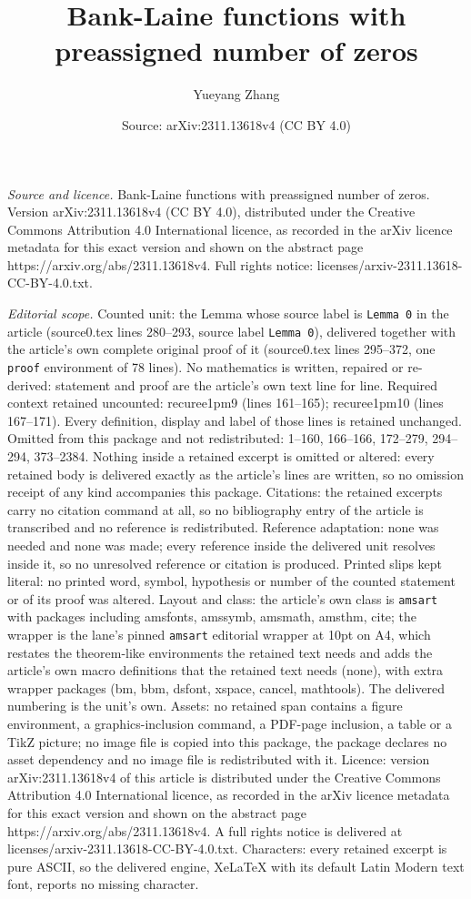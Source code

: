 \documentclass[10pt,a4paper]{amsart}
\title[Bank-Laine functions with preassigned number of zeros]{Bank-Laine functions with preassigned number of zeros}
\author{Yueyang Zhang}
\date{Source: arXiv:2311.13618v4 (CC BY 4.0)}
\begin{document}
\maketitle

\noindent\emph{Source and licence.} Bank-Laine functions with preassigned number of zeros. Version arXiv:2311.13618v4 (CC BY 4.0), distributed under the Creative Commons Attribution 4.0 International licence, as recorded in the arXiv licence metadata for this exact version and shown on the abstract page https://arxiv.org/abs/2311.13618v4. Full rights notice: licenses/arxiv-2311.13618-CC-BY-4.0.txt.\par\smallskip

\noindent\textit{Editorial scope.} Counted unit: the Lemma whose source label is \texttt{Lemma 0} in the article (source0.tex lines 280--293, source label \texttt{Lemma 0}), delivered together with the article's own complete original proof of it (source0.tex lines 295--372, one \texttt{proof} environment of 78 lines). No mathematics is written, repaired or re-derived: statement and proof are the article's own text line for line. Required context retained uncounted: recuree1pm9 (lines 161--165); recuree1pm10 (lines 167--171). Every definition, display and label of those lines is retained unchanged. Omitted from this package and not redistributed: 1--160, 166--166, 172--279, 294--294, 373--2384. Nothing inside a retained excerpt is omitted or altered: every retained body is delivered exactly as the article's lines are written, so no omission receipt of any kind accompanies this package. Citations: the retained excerpts carry no citation command at all, so no bibliography entry of the article is transcribed and no reference is redistributed. Reference adaptation: none was needed and none was made; every reference inside the delivered unit resolves inside it, so no unresolved reference or citation is produced. Printed slips kept literal: no printed word, symbol, hypothesis or number of the counted statement or of its proof was altered. Layout and class: the article's own class is \texttt{amsart} with packages including amsfonts, amssymb, amsmath, amsthm, cite; the wrapper is the lane's pinned \texttt{amsart} editorial wrapper at 10pt on A4, which restates the theorem-like environments the retained text needs and adds the article's own macro definitions that the retained text needs (none), with extra wrapper packages (bm, bbm, dsfont, xspace, cancel, mathtools). The delivered numbering is the unit's own. Assets: no retained span contains a figure environment, a graphics-inclusion command, a PDF-page inclusion, a table or a TikZ picture; no image file is copied into this package, the package declares no asset dependency and no image file is redistributed with it. Licence: version arXiv:2311.13618v4 of this article is distributed under the Creative Commons Attribution 4.0 International licence, as recorded in the arXiv licence metadata for this exact version and shown on the abstract page https://arxiv.org/abs/2311.13618v4. A full rights notice is delivered at licenses/arxiv-2311.13618-CC-BY-4.0.txt. Characters: every retained excerpt is pure ASCII, so the delivered engine, XeLaTeX with its default Latin Modern text font, reports no missing character.
\end{document}
